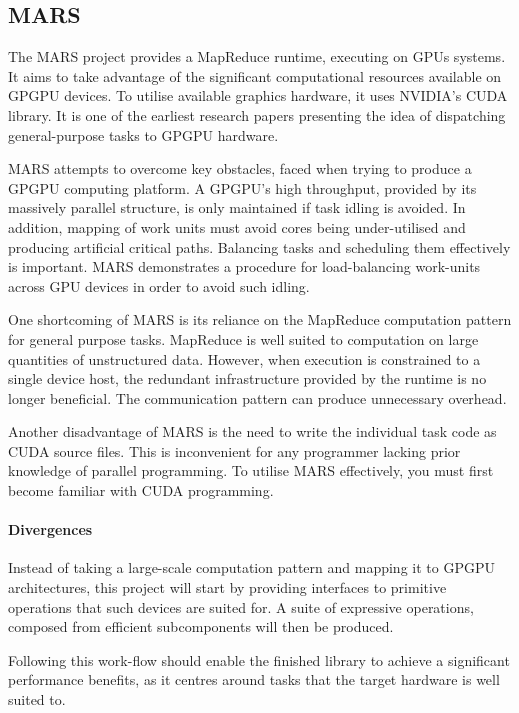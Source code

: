 \subsection{MARS}
The MARS\cite{mars} project provides a MapReduce\cite{mapreduce} runtime, executing on \acp{GPU} systems.
It aims to take advantage of the significant computational resources available on \ac{GPGPU} devices. To utilise available graphics hardware, it uses NVIDIA's \ac{CUDA} library. It is one of the earliest research papers presenting the idea of dispatching general-purpose tasks to \ac{GPGPU} hardware.

MARS attempts to overcome key obstacles, faced when trying to produce a \ac{GPGPU} computing platform.
A \ac{GPGPU}'s high throughput, provided by its massively parallel structure, is only maintained if task idling is avoided. In addition, mapping of work units must avoid cores being under-utilised and producing artificial critical paths. Balancing tasks and scheduling them effectively is important. MARS demonstrates a procedure for load-balancing work-units across \ac{GPU} devices in order to avoid such idling.

One shortcoming of MARS is its reliance on the MapReduce computation pattern for general purpose tasks. MapReduce is well suited to computation on large quantities of unstructured data. However, when execution is constrained to a single device host, the redundant infrastructure provided by the runtime is no longer beneficial. The communication pattern can produce unnecessary overhead.

Another disadvantage of MARS is the need to write the individual task code as \ac{CUDA} source files. This is inconvenient for any programmer lacking prior knowledge of parallel programming. To utilise MARS effectively, you must first become familiar with \ac{CUDA} programming.

\paragraph*{Divergences}
Instead of taking a large-scale computation pattern and mapping it to \ac{GPGPU} architectures, this project will start by providing interfaces to primitive operations that such devices are suited for. A suite of expressive operations, composed from efficient subcomponents will then be produced.

Following this work-flow should enable the finished library to achieve a significant performance benefits, as it centres around tasks that the target hardware is well suited to.

